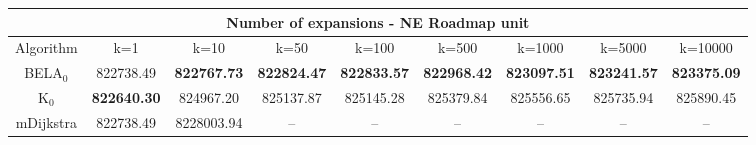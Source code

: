 \begin{tabular}{c|cccccccc}\toprule
\multicolumn{9}{c}{Number of expansions - NE Roadmap unit}\\ \midrule
Algorithm & k=1 & k=10 & k=50 & k=100 & k=500 & k=1000 & k=5000 & k=10000 \\ \midrule
BELA$_0$ & 822738.49 & \textbf{822767.73} & \textbf{822824.47} & \textbf{822833.57} & \textbf{822968.42} & \textbf{823097.51} & \textbf{823241.57} & \textbf{823375.09} \\
K$_0$ & \textbf{822640.30} & 824967.20 & 825137.87 & 825145.28 & 825379.84 & 825556.65 & 825735.94 & 825890.45 \\
mDijkstra & 822738.49 & 8228003.94 & -- & -- & -- & -- & -- & -- \\ \bottomrule 
\end{tabular}

